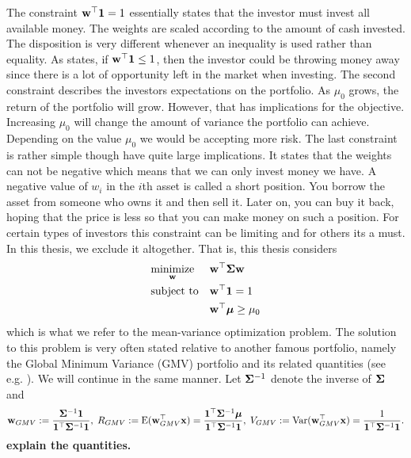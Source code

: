 \documentclass[]{book}\usepackage{knitr}
\begin{document}
The constraint $\mathbf{w}^\top \mathbf{1} = 1$ essentially states that the investor must invest all available money. 
The weights are scaled according to the amount of cash invested.
The disposition is very different whenever an inequality is used rather than equality. 
As \citet{hult2012risk} states, if $\mathbf{w}^\top \mathbf{1} \leq 1$, then the investor could be throwing money away since there is a lot of opportunity left in the market when investing.
The second constraint describes the investors expectations on the portfolio. 
As $\mu_0$ grows, the return of the portfolio will grow. 
However, that has implications for the objective. 
Increasing $\mu_0$ will change the amount of variance the portfolio can achieve. 
Depending on the value $\mu_0$ we would be accepting more risk. 
The last constraint is rather simple though have quite large implications. 
It states that the weights can not be negative which means that we can only invest money we have. 
A negative value of $w_i$ in the $i$th asset is called a short position.
You borrow the asset from someone who owns it and then sell it. 
Later on, you can buy it back, hoping that the price is less so that you can make money on such a position. 
For certain types of investors this constraint can be limiting and for others its a must.
In this thesis, we exclude it altogether. That is, this thesis considers
\begin{equation}\label{eqn:mean_variance}
\begin{aligned}
& \underset{\mathbf{w}}{\text{minimize}} 
& & \mathbf{w}^\top \mathbf{\Sigma} \mathbf{w} \\
& \text{subject to}
& & \mathbf{w}^\top \mathbf{1} = 1 \\
& && \mathbf{w}^\top \mbox{\boldmath$\mu$} \geq \mu_0 \\
\end{aligned}
\end{equation}
which is what we refer to the mean-variance optimization problem. The solution to this problem is very often stated relative to another famous portfolio, namely the Global Minimum Variance (GMV) portfolio and its related quantities (see e.g. \citet{Bodnar2009CaIotEFiEM, bodnar2013equivalence, bauder2018bayesian}). We will continue in the same manner. Let $\mathbf{\Sigma}^{-1}$ denote the inverse of $\mathbf{\Sigma}$ and
\begin{equation}
	\mathbf{w}_{GMV} := \frac{\mathbf{\Sigma}^{-1}\mathbf{1}}{\mathbf{1}^\top \mathbf{\Sigma}^{-1}\mathbf{1}}, \; R_{GMV} :=\operatorname{E}(\mathbf{w}_{GMV}^\top\mathbf{x}) = \frac{\mathbf{1}^\top\mathbf{\Sigma}^{-1}\mbox{\boldmath$\mu$}}{\mathbf{1}^\top \mathbf{\Sigma}^{-1}\mathbf{1}}, \;
	V_{GMV} := \operatorname{Var}(\mathbf{w}_{GMV}^\top\mathbf{x}) =\frac{1}{\mathbf{1}^\top \mathbf{\Sigma}^{-1}\mathbf{1}}.
\end{equation}
 \textbf{explain the quantities.}
  
\end{document}

